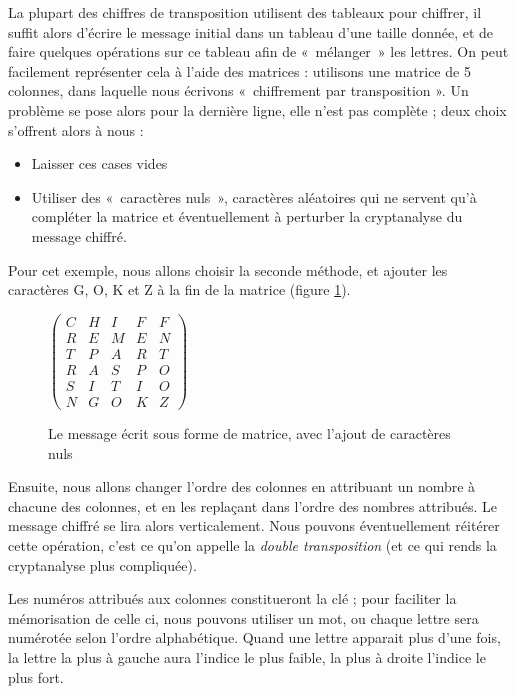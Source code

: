 La plupart des chiffres de transposition utilisent des tableaux pour
chiffrer, il suffit alors d'écrire le message initial dans un tableau
d'une taille donnée, et de faire quelques opérations sur ce tableau
afin de «~mélanger~» les lettres. On peut facilement représenter cela
à l'aide des matrices : utilisons une matrice de 5
colonnes, dans laquelle nous écrivons «~chiffrement par transposition
». Un problème se pose alors pour la dernière ligne, elle n'est pas
complète ; deux choix s'offrent alors à nous : 
\begin{itemize}
  \item Laisser ces cases vides
  \item Utiliser des «~caractères nuls~», caractères aléatoires qui ne
    servent qu'à compléter la matrice et éventuellement à perturber la
    cryptanalyse du message chiffré.
\end{itemize}
Pour cet exemple, nous allons choisir la seconde méthode, et ajouter
les caractères G, O, K et Z à la fin de la matrice (figure
\ref{fig:TranspositionMatriceNul}).
\begin{figure}[h]
  \begin{center}
  $
  \left(
    \begin{array}{ccccc}
      C & H & I & F & F \\
      R & E & M & E & N \\
      T & P & A & R & T \\
      R & A & S & P & O \\
      S & I & T & I & O \\
      N & G & O & K & Z 
    \end{array}
  \right)
  $
  \end{center}
  \caption{Le message écrit sous forme de matrice, avec l'ajout de
    caractères nuls}
  \label{fig:TranspositionMatriceNul}
\end{figure}

Ensuite, nous allons changer l'ordre des colonnes en attribuant un
nombre à chacune des colonnes, et en les replaçant dans l'ordre des
nombres attribués. Le message chiffré se lira alors verticalement.
Nous pouvons éventuellement réitérer cette opération, c'est ce qu'on
appelle la \emph{double transposition} (et ce qui rends la cryptanalyse plus
compliquée).

Les numéros attribués aux colonnes constitueront la clé ; pour
faciliter la mémorisation de celle ci, nous pouvons utiliser un mot,
ou chaque lettre sera numérotée selon l'ordre alphabétique. Quand une
lettre apparait plus d'une fois, la lettre la plus à gauche aura
l'indice le plus faible, la plus à droite l'indice le plus fort.

